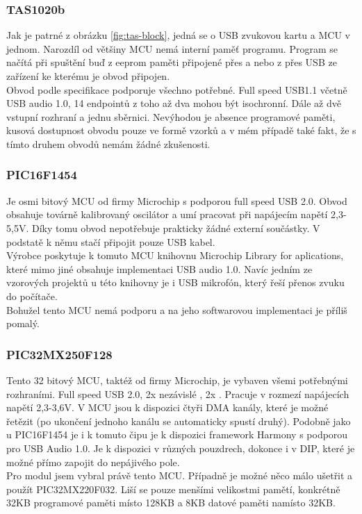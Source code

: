 \subsubsection{TAS1020b}	
Jak je patrné z obrázku \ref{fig:tas-block}, jedná se o USB \iis zvukovou kartu a MCU v jednom. Narozdíl od většiny MCU nemá interní paměť programu. Program se načítá při spuštění buď z eeprom paměti připojené přes \iic a nebo z přes USB ze zařízení ke kterému je obvod připojen.\\
Obvod podle specifikace \cite{tas} podporuje všechno potřebné. Full speed USB1.1 včetně USB audio 1.0, 14 endpointů z toho až dva mohou být isochronní. Dále až dvě vstupní \iis rozhraní a jednu \iic sběrnici. Nevýhodou je absence programové paměti, kusová dostupnost obvodu pouze ve formě vzorků a v mém případě také fakt, že s tímto druhem obvodů nemám žádné zkušenosti.

\subsubsection{PIC16F1454}
Je osmi bitový MCU od firmy Microchip s podporou full speed USB 2.0. Obvod obsahuje továrně kalibrovaný oscilátor a umí pracovat při napájecím napětí 2,3-5,5V. Díky tomu obvod nepotřebuje prakticky žádné externí součástky. V podstatě k němu stačí připojit pouze USB kabel.\\
Výrobce poskytuje k tomuto MCU knihovnu Microchip Library for aplications, které mimo jiné obsahuje implementaci USB audio 1.0. Navíc jedním ze vzorových projektů u této knihovny je i USB mikrofón, který řeší přenos zvuku do počítače.\\
Bohužel tento MCU nemá podporu \iis a na jeho softwarovou implementaci je příliš pomalý. 

\subsubsection{PIC32MX250F128}
Tento 32 bitový MCU, taktéž od firmy Microchip, je vybaven všemi potřebnými rozhraními. Full speed USB 2.0, 2x nezávislé \iis, 2x \iic. Pracuje v rozmezí napájecích napětí 2,3-3,6V. V MCU jsou k dispozici čtyři DMA kanály, které je možné řetězit (po ukončení jednoho kanálu se automaticky spustí druhý). Podobně jako u PIC16F1454 je i k tomuto čipu je k dispozici framework Harmony \cite{harmony} s podporou pro USB Audio 1.0. Je k dispozici v různých pouzdrech, dokonce i v DIP, které je možné přímo zapojit do nepájivého pole.\\
Pro modul jsem vybral právě tento MCU. Případně je možné něco málo ušetřit a použít PIC32MX220F032. Liší se pouze menšími velikostmi pamětí, konkrétně 32KB programové paměti místo 128KB a 8KB datové paměti namísto 32KB.

